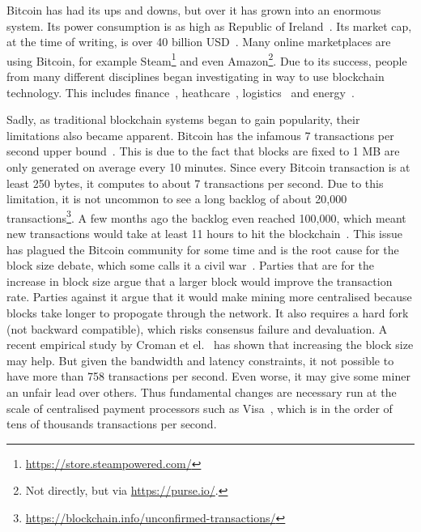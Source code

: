 Bitcoin has had its ups and downs, but over it has grown into an enormous system.
Its power consumption is as high as Republic of Ireland~\cite{o2014bitcoin}.
Its market cap, at the time of writing, is over 40 billion USD~\cite{bitcoinmarketcap}.
Many online marketplaces are using Bitcoin, for example Steam\footnote{\url{https://store.steampowered.com/}} and even Amazon\footnote{Not directly, but via \url{https://purse.io/}.}.
Due to its success, people from many different disciplines began investigating in way to use blockchain technology.
This includes finance~\cite{finance}, heathcare~\cite{healthcare}, logistics~\cite{supplychain} and energy~\cite{energy}.

Sadly, as traditional blockchain systems began to gain popularity,
their limitations also became apparent.
Bitcoin has the infamous 7 transactions per second upper bound~\cite{vukolic2015quest}.
This is due to the fact that blocks are fixed to 1 MB are only generated on average every 10 minutes.
Since every Bitcoin transaction is at least 250 bytes, it computes to about 7 transactions per second.
Due to this limitation, it is not uncommon to see a long backlog of about 20,000 transactions\footnote{\url{https://blockchain.info/unconfirmed-transactions/}}.
A few months ago the backlog even reached 100,000, which meant new transactions would take at least 11 hours to hit the blockchain~\cite{bitcoinbacklog}.
This issue has plagued the Bitcoin community for some time and is the root cause for the block size debate, which some calls it a civil war~\cite{bitcoincivilwar}.
Parties that are for the increase in block size argue that a larger block would improve the transaction rate.
Parties against it argue that it would make mining more centralised because blocks take longer to propogate through the network.
It also requires a hard fork (not backward compatible), which risks consensus failure and devaluation.
A recent empirical study by Croman et el.~\cite{croman2016scaling} has shown that increasing the block size may help.
But given the bandwidth and latency constraints,
it not possible to have more than 758 transactions per second.
Even worse, it may give some miner an unfair lead over others.
Thus fundamental changes are necessary run at the scale of centralised payment processors such as Visa~\cite{visa},
which is in the order of tens of thousands transactions per second.

